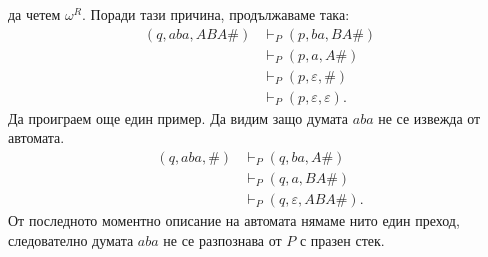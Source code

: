 \begin{example}
  да четем $\omega^R$. Поради тази причина, продължаваме така:
  \begin{align*}
    (q, aba, ABA\#) & \vdash_P (p, ba, BA\#)\\
    & \vdash_P (p, a, A\#)\\
    & \vdash_P (p, \varepsilon, \#) \\
    & \vdash_P (p,\varepsilon,\varepsilon).
  \end{align*}
  Да проиграем още един пример. Да видим защо думата $aba$ не се извежда от автомата.
  \begin{align*}
    (q,aba,\#) & \vdash_P (q, ba,A\#)\\
    & \vdash_P (q, a, BA\#)\\
    & \vdash_P (q, \varepsilon, ABA\#).
  \end{align*}
  От последното моментно описание на автомата нямаме нито един преход, следователно
  думата $aba$ не се разпознава от $P$ с празен стек.
\end{example}

